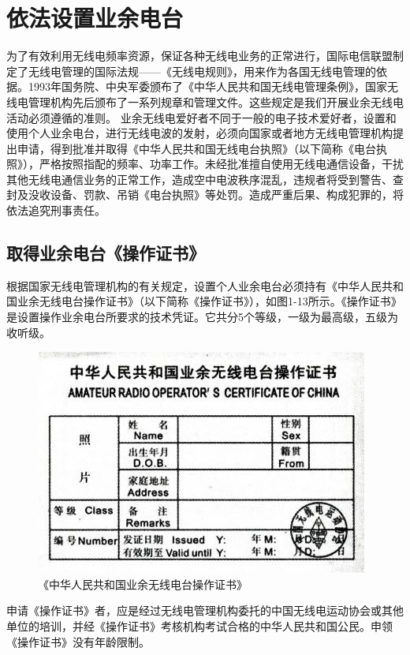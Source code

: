 \documentclass[12pt,UTF8]{ctexbook}
\begin{document}
\section{依法设置业余电台}

为了有效利用无线电频率资源，保证各种无线电业务的正常进行，国际电信联盟制定了无线电管理的国际法规——《无线电规则》，用来作为各国无线电管理的依据。1993年国务院、中央军委颁布了《中华人民共和国无线电管理条例》，国家无线电管理机构先后颁布了一系列规章和管理文件。这些规定是我们开展业余无线电活动必须遵循的准则。
业余无线电爱好者不同于一般的电子技术爱好者，设置和使用个人业余电台，进行无线电波的发射，必须向国家或者地方无线电管理机构提出申请，得到批准并取得《中华人民共和国无线电台执照》（以下简称《电台执照》），严格按照指配的频率、功率工作。未经批准擅自使用无线电通信设备，干扰其他无线电通信业务的正常工作，造成空中电波秩序混乱，违规者将受到警告、查封及没收设备、罚款、吊销《电台执照》等处罚。造成严重后果、构成犯罪的，将依法追究刑事责任。

\subsection{取得业余电台《操作证书》}

根据国家无线电管理机构的有关规定，设置个人业余电台必须持有《中华人民共和国业余无线电台操作证书》（以下简称《操作证书》），如图1-13所示。《操作证书》是设置操作业余电台所要求的技术凭证。它共分5个等级，一级为最高级，五级为收听级。

\begin{figure}[htbp]
	\centering
	\includegraphics[width=0.7\linewidth]{13}
	\caption{《中华人民共和国业余无线电台操作证书》}
	\label{fig:1}
\end{figure}

申请《操作证书》者，应是经过无线电管理机构委托的中国无线电运动协会或其他单位的培训，并经《操作证书》考核机构考试合格的中华人民共和国公民。申领《操作证书》没有年龄限制。
\end{document}
